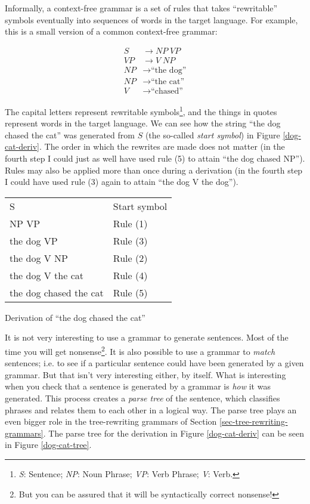 \documentclass[12pt]{article}
\newcommand{\defn}[1]{\textit{#1}}
\begin{document}
Informally, a context-free grammar is a set of rules that takes
``rewritable'' symbols eventually into sequences of words in the target
language.  For example, this is a small version of a common context-free
grammar:

\begin{align}
S  &\rightarrow \mathit{NP} \; \mathit{VP}      \tag{1} \\
\mathit{VP} &\rightarrow V \; \mathit{NP}       \tag{2} \\
\mathit{NP} &\rightarrow \text{``the dog''}     \tag{3} \\
\mathit{NP} &\rightarrow \text{``the cat''}     \tag{4} \\
V  &\rightarrow \text{``chased''}               \tag{5}
\end{align}

The capital letters represent rewritable symbols\footnote{\textit{S}:
Sentence; \textit{NP}: Noun Phrase; \textit{VP}: Verb Phrase;
\textit{V}: Verb.}, and the things in quotes represent words in the
target language.  We can see how the string ``the dog chased the cat''
was generated from $S$ (the so-called \defn{start symbol}) in Figure
\ref{dog-cat-deriv}.  The order in which the rewrites are made does not
matter (in the fourth step I could just as well have used rule (5) to
attain ``the dog chased NP'').  Rules may also be applied more than once
during a derivation (in the fourth step I could have used rule (3) again
to attain ``the dog V the dog'').

\begin{Figure}
\begin{tabularx}{\linewidth}{X|X}
S                      & Start symbol \\
NP VP                  & Rule (1) \\
the dog VP             & Rule (3) \\
the dog V NP           & Rule (2) \\
the dog V the cat      & Rule (4) \\
the dog chased the cat & Rule (5) \\
\end{tabularx}
\caption{Derivation of ``the dog chased the cat''}
\label{dog-cat-deriv}
\end{Figure}

It is not very interesting to use a grammar to generate sentences.  Most
of the time you will get nonsense\footnote{But you can be assured that
it will be syntactically correct nonsense!}.  It is also possible to use
a grammar to \textit{match} sentences; i.e. to see if a particular
sentence could have been generated by a given grammar.   But that isn't
very interesting either, by itself.  What is interesting when you check
that a sentence is generated by a grammar is \textit{how} it was
generated.  This process creates a \defn{parse tree} of the sentence,
which classifies phrases and relates them to each other in a logical
way.  The parse tree plays an even bigger role in the tree-rewriting
grammars of Section \ref{sec-tree-rewriting-grammars}. The parse tree
for the derivation in Figure \ref{dog-cat-deriv} can be seen in Figure
\ref{dog-cat-tree}.
\end{document}

